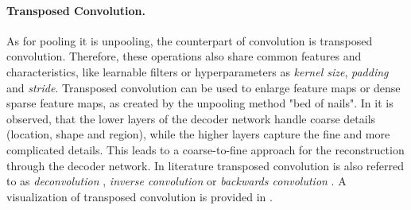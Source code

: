 
\paragraph{Transposed Convolution.}
As for pooling it is unpooling, the counterpart of convolution is transposed convolution.
Therefore, these operations also share common features and characteristics, like learnable filters or hyperparameters as \textit{kernel size}, \textit{padding} and \textit{stride}.
Transposed convolution can be used to enlarge feature maps or dense sparse feature maps, as created by the unpooling method "bed of nails".
In \cite{NHH15-DeConvNet} it is observed, that the lower layers of the decoder network handle coarse details (\eg location, shape and region), while the higher layers capture the fine and more complicated details.
This leads to a coarse-to-fine approach for the reconstruction through the decoder network.
In literature transposed convolution is also referred to as  \textit{deconvolution} \cite{NHH15-DeConvNet}, \textit{inverse convolution} \cite{Bad17-SegNet} or \textit{backwards convolution} \cite{LSD15-FCN}.
A visualization of transposed convolution is provided in \cite{DV19-ConvolutionGuide}.

